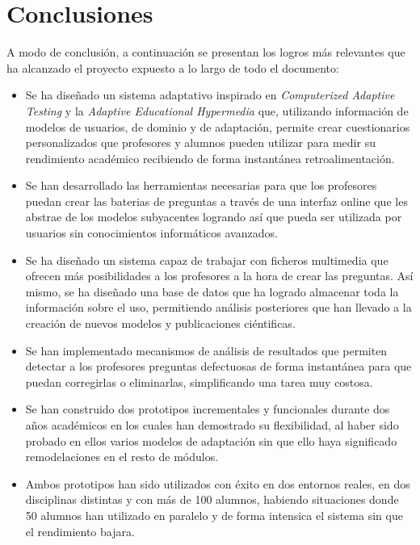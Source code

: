 \chapter{Conclusiones\label{sec:conclusiones}}

A modo de conclusión, a continuación se presentan los logros más relevantes que ha alcanzado el proyecto expuesto a lo largo de todo el documento:

\begin{itemize}
	\item Se ha diseñado un sistema adaptativo inspirado en \textit{Computerized Adaptive Testing} y la \textit{Adaptive Educational Hypermedia} que, utilizando información de modelos de usuarios, de dominio y de adaptación, permite crear cuestionarios personalizados que profesores y alumnos pueden utilizar para medir su rendimiento académico recibiendo de forma instantánea retroalimentación.
	\item Se han desarrollado las herramientas necesarias para que los profesores puedan crear las baterias de preguntas a través de una interfaz online que les abstrae de los modelos subyacentes logrando así que pueda ser utilizada por usuarios sin conocimientos informáticos avanzados.
	\item Se ha diseñado un sistema capaz de trabajar con ficheros multimedia que ofrecen más posibilidades a los profesores a la hora de crear las preguntas. Así mismo, se ha diseñado una base de datos que ha logrado almacenar toda la información sobre el uso, permitiendo análisis posteriores que han llevado a la creación de nuevos modelos y publicaciones ciéntificas.
	\item Se han implementado mecanismos de análisis de resultados que permiten detectar a los profesores preguntas defectuosas de forma instantánea para que puedan corregirlas o eliminarlas, simplificando una tarea muy costosa.
	\item Se han construido dos prototipos incrementales y funcionales durante dos años académicos en los cuales han demostrado su flexibilidad, al haber sido probado en ellos varios modelos de adaptación sin que ello haya significado remodelaciones en el resto de módulos.
	\item Ambos prototipos han sido utilizados con éxito en dos entornos reales, en dos disciplinas distintas y con más de 100 alumnos, habiendo situaciones donde 50 alumnos han utilizado en paralelo y de forma intensica el sistema sin que el rendimiento bajara.
\end{itemize}


